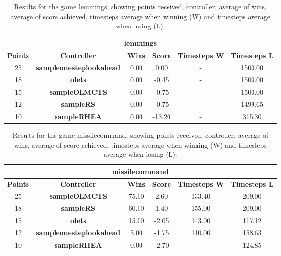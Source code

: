 \begin{table*}[!t]
\begin{center}
\begin{tabular}{|c|c|c|c|c|c|}
\multicolumn{6}{c}{\textbf{lemmings}}\\
\hline
\textbf{Points} & \textbf{Controller} & \textbf{Wins} &  \textbf{Score} & \textbf{Timesteps W} & \textbf{Timesteps L}\\
\hline
25 & \textbf{sampleonesteplookahead} & 0.00 & 0.00 &  -  & 1500.00
 \\
\hline
18 & \textbf{olets} & 0.00 & -0.45 &  -  & 1500.00
 \\
\hline
15 & \textbf{sampleOLMCTS} & 0.00 & -0.75 &  -  & 1500.00
 \\
\hline
12 & \textbf{sampleRS} & 0.00 & -0.75 &  -  & 1499.65
 \\
\hline
10 & \textbf{sampleRHEA} & 0.00 & -13.20 &  -  & 315.30
 \\
\hline
\end{tabular}
\caption{Results for the game lemmings, showing points received, controller, average of wins, average of score achieved, timesteps average when winning (W) and timesteps average when losing (L).}
\label{tab:weights}
\end{center}
\end{table*}
\begin{table*}[!t]
\begin{center}
\begin{tabular}{|c|c|c|c|c|c|}
\multicolumn{6}{c}{\textbf{missilecommand}}\\
\hline
\textbf{Points} & \textbf{Controller} & \textbf{Wins} &  \textbf{Score} & \textbf{Timesteps W} & \textbf{Timesteps L}\\
\hline
25 & \textbf{sampleOLMCTS} & 75.00 & 2.60 & 133.40 & 209.00
 \\
\hline
18 & \textbf{sampleRS} & 60.00 & 1.40 & 155.00 & 209.00
 \\
\hline
15 & \textbf{olets} & 15.00 & -2.05 & 143.00 & 117.12
 \\
\hline
12 & \textbf{sampleonesteplookahead} & 5.00 & -1.75 & 110.00 & 158.63
 \\
\hline
10 & \textbf{sampleRHEA} & 0.00 & -2.70 &  -  & 124.85
 \\
\hline
\end{tabular}
\caption{Results for the game missilecommand, showing points received, controller, average of wins, average of score achieved, timesteps average when winning (W) and timesteps average when losing (L).}
\label{tab:weights}
\end{center}
\end{table*}
